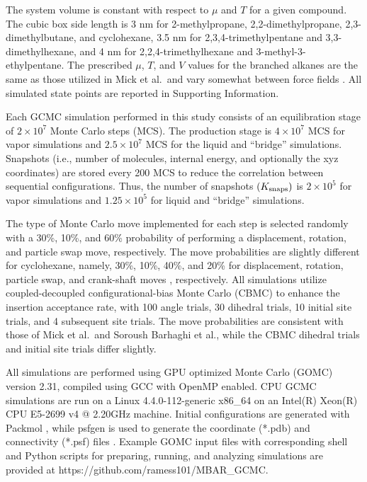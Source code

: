 \documentclass[journal=jced,manuscript=article]{achemso}
\begin{document}
The system volume is constant with respect to $\mu$ and $T$ for a given compound. The cubic box side length is 3 nm for 2-methylpropane, 2,2-dimethylpropane, 2,3-dimethylbutane, and cyclohexane, 3.5 nm for 2,3,4-trimethylpentane and 3,3-dimethylhexane, and 4 nm for 2,2,4-trimethylhexane and 3-methyl-3-ethylpentane. The prescribed $\mu$, $T$, and $V$ values for the branched alkanes are the same as those utilized in Mick et al.~and vary somewhat between force fields \cite{Potoff_branched}. All simulated state points are reported in Supporting Information. 


Each GCMC simulation performed in this study consists of an equilibration stage of $2 \times 10^7$ Monte Carlo steps (MCS). The production stage is $4 \times 10^7$ MCS for vapor simulations and $2.5 \times 10^7$ MCS for the liquid and ``bridge'' simulations. Snapshots (i.e., number of molecules, internal energy, and optionally the xyz coordinates) are stored every 200 MCS to reduce the correlation between sequential configurations. Thus, the number of snapshots $(K_{\rm snaps})$ is $2 \times 10^5$ for vapor simulations and $1.25 \times 10^5$ for liquid and ``bridge'' simulations. 

The type of Monte Carlo move implemented for each step is selected randomly with a 30\%, 10\%, and 60\% probability of performing a displacement, rotation, and particle swap move, respectively. The move probabilities are slightly different for cyclohexane, namely, 30\%, 10\%, 40\%, and 20\% for displacement, rotation, particle swap, and crank-shaft moves \cite{Shah2011}, respectively. All simulations utilize coupled-decoupled configurational-bias Monte Carlo (CBMC)\cite{Martin1999} to enhance the insertion acceptance rate, with 100 angle trials, 30 dihedral trials, 10 initial site trials, and 4 subsequent site trials. The move probabilities are consistent with those of Mick et al.~and Soroush Barhaghi et al., while the CBMC dihedral trials and initial site trials differ slightly.

All simulations are performed using GPU optimized Monte Carlo (GOMC) \cite{GOMC} version 2.31, compiled using GCC with OpenMP enabled. CPU GCMC simulations are run on a Linux 4.4.0-112-generic x86\_64 on an Intel(R) Xeon(R) CPU E5-2699 v4 @ 2.20GHz machine. Initial configurations are generated with Packmol \cite{PACKMOL}, while psfgen is used to generate the coordinate (*.pdb) and connectivity (*.psf) files \cite{VMD}. Example GOMC input files with corresponding shell and Python scripts for preparing, running, and analyzing simulations are provided at https://github.com/ramess101/MBAR\_GCMC.
\end{document}
